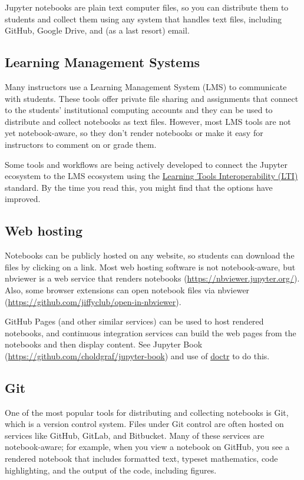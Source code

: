\documentclass[]{book}
\begin{document}
Jupyter notebooks are plain text computer files, so you can distribute
them to students and collect them using any system that handles text
files, including GitHub, Google Drive, and (as a last resort) email.

\subsection{Learning Management
Systems}\label{learning-management-systems}

Many instructors use a Learning Management System (LMS) to communicate
with students. These tools offer private file sharing and assignments
that connect to the students' institutional computing accounts and they
can be used to distribute and collect notebooks as text files. However,
most LMS tools are not yet notebook-aware, so they don't render
notebooks or make it easy for instructors to comment on or grade them.

Some tools and workflows are being actively developed to connect the
Jupyter ecosystem to the LMS ecosystem using the
\href{https://open.edx.org/learning-tools-interoperability}{Learning
Tools Interoperability (LTI)} standard. By the time you read this, you
might find that the options have improved.

\subsection{Web hosting}\label{web-hosting}

Notebooks can be publicly hosted on any website, so students can
download the files by clicking on a link. Most web hosting software is
not notebook-aware, but nbviewer is a web service that renders notebooks
(\url{https://nbviewer.jupyter.org/}). Also, some browser extensions can
open notebook files via nbviewer
(\url{https://github.com/jiffyclub/open-in-nbviewer}).

GitHub Pages (and other similar services) can be used to host rendered
notebooks, and continuous integration services can build the web pages
from the notebooks and then display content. See Jupyter Book
(\url{https://github.com/choldgraf/jupyter-book}) and use of
\href{https://drdoctr.github.io/doctr}{doctr} to do this.

\subsection{Git}\label{git}

One of the most popular tools for distributing and collecting notebooks
is Git, which is a version control system. Files under Git control are
often hosted on services like GitHub, GitLab, and Bitbucket. Many of
these services are notebook-aware; for example, when you view a notebook
on GitHub, you see a rendered notebook that includes formatted text,
typeset mathematics, code highlighting, and the output of the code,
including figures.
\end{document}
